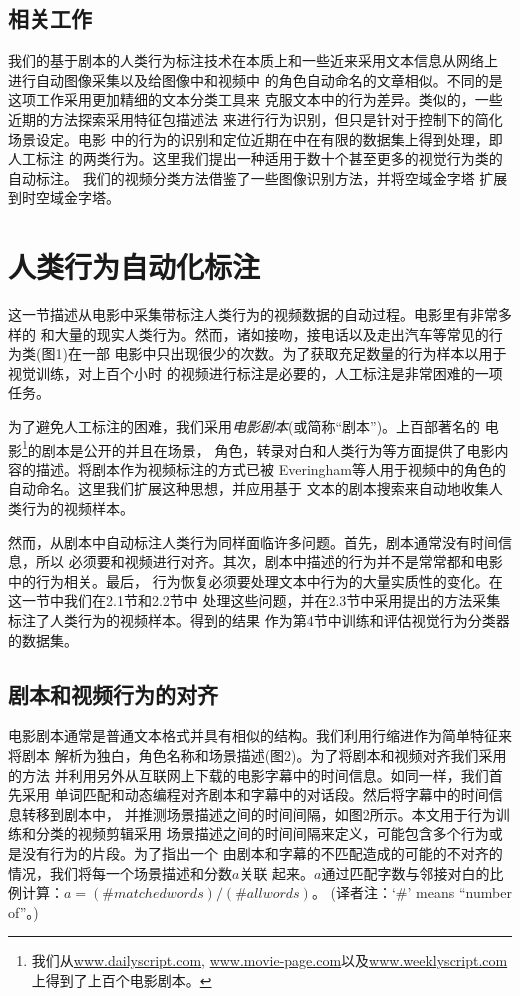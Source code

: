 \documentclass[10pt,twocolumn,letterpaper]{article}
\begin{document}
\subsection{相关工作}
我们的基于剧本的人类行为标注技术在本质上和一些近来采用文本信息从网络上
\cite{10,14}进行自动图像采集以及给图像中\cite{1}和视频中\cite{4}
的角色自动命名的文章相似。不同的是这项工作采用更加精细的文本分类工具来
克服文本中的行为差异。类似的，一些近期的方法探索采用特征包描述法
来进行行为识别\cite{3,6,13,15,19}，但只是针对于控制下的简化场景设定。电影
中的行为的识别和定位近期在\cite{8}中在有限的数据集上得到处理，即人工标注
的两类行为。这里我们提出一种适用于数十个甚至更多的视觉行为类的自动标注。
我们的视频分类方法借鉴了一些图像识别方法\cite{2,9,12,20}，并将空域金字塔
\cite{9}扩展到时空域金字塔。

\section{人类行为自动化标注}
这一节描述从电影中采集带标注人类行为的视频数据的自动过程。电影里有非常多样的
和大量的现实人类行为。然而，诸如接吻，接电话以及走出汽车等常见的行为类(图1)在一部
电影中只出现很少的次数。为了获取充足数量的行为样本以用于视觉训练，对上百个小时
的视频进行标注是必要的，人工标注是非常困难的一项任务。

为了避免人工标注的困难，我们采用\textit{电影剧本}(或简称``剧本'')。上百部著名的
电影\footnote{我们从\url{www.dailyscript.com},
\url{www.movie-page.com}以及\url{www.weeklyscript.com}上得到了上百个电影剧本。}的剧本是公开的并且在场景，
角色，转录对白和人类行为等方面提供了电影内容的描述。将剧本作为视频标注的方式已被
Everingham等人\cite{4}用于视频中的角色的自动命名。这里我们扩展这种思想，并应用基于
文本的剧本搜索来自动地收集人类行为的视频样本。

然而，从剧本中自动标注人类行为同样面临许多问题。首先，剧本通常没有时间信息，所以
必须要和视频进行对齐。其次，剧本中描述的行为并不是常常都和电影中的行为相关。最后，
行为恢复必须要处理文本中行为的大量实质性的变化。在这一节中我们在2.1节和2.2节中
处理这些问题，并在2.3节中采用提出的方法采集标注了人类行为的视频样本。得到的结果
作为第4节中训练和评估视觉行为分类器的数据集。

\subsection{剧本和视频行为的对齐}
电影剧本通常是普通文本格式并具有相似的结构。我们利用行缩进作为简单特征来将剧本
解析为独白，角色名称和场景描述(图2)。为了将剧本和视频对齐我们采用\cite{4}的方法
并利用另外从互联网上下载的电影字幕中的时间信息。如同\cite{4}一样，我们首先采用
单词匹配和动态编程对齐剧本和字幕中的对话段。然后将字幕中的时间信息转移到剧本中，
并推测场景描述之间的时间间隔，如图2所示。本文用于行为训练和分类的视频剪辑采用
场景描述之间的时间间隔来定义，可能包含多个行为或是没有行为的片段。为了指出一个
由剧本和字幕的不匹配造成的可能的不对齐的情况，我们将每一个场景描述和分数$a$关联
起来。$a$通过匹配字数与邻接对白的比例计算：$a=(\#matched words)/(\#all words)$。
(译者注：`\#' means ``number of''。)
\end{document}

